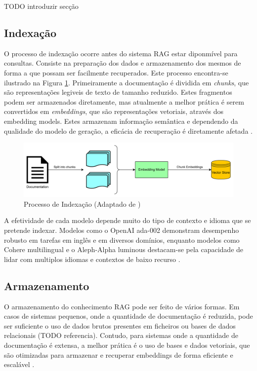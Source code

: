 TODO introduzir secção

\subsection{Indexação}

O processo de indexação ocorre antes do sistema RAG estar diponmível para consultas. Consiste na preparação dos dados e armazenamento dos mesmos de forma a que possam ser facilmente recuperados. Este processo encontra-se ilustrado na Figura \ref{fig:acrh-rag}. Primeiramente a documentação é dividida em \textit{chunks}, que são representações legiveis de texto de tamanho reduzido. Estes fragmentos podem ser armazenados diretamente, mas atualmente a melhor prática é serem convertidos em \textit{embeddings}, que são representações vetoriais, através dos embedding models. Estes armazenam informação semântica e dependendo da qualidade do modelo de geração, a eficácia de recuperação é diretamente afetada \parencite{rau2024context, vspeleticexploring}.


\begin{figure}[H]
        \centering
        \includegraphics[width=1\linewidth]{ch3/assets/arquitetura-embedding.png}
        \caption{Processo de Indexação (Adaptado de \cite{vspeleticexploring})}
        \label{fig:acrh-rag}
\end{figure}


A efetividade de cada modelo depende muito do tipo de contexto e idioma que se pretende indexar. Modelos como o OpenAI ada-002 demonstram desempenho robusto em tarefas em inglês e em diversos domínios, enquanto modelos como Cohere multilingual e o Aleph-Alpha luminous destacam-se pela capacidade de lidar com multiplos idiomas e contextos de baixo recurso \parencite{kamalloo2023evaluating}. 


\subsection{Armazenamento}

O armazenamento do conhecimento RAG pode ser feito de vários formas. Em casos de sistemas pequenos, onde a quantidade de documentação é reduzida, pode ser suficiente o uso de dados brutos presentes em ficheiros ou bases de dados relacionais (TODO referencia). Contudo, para sistemas onde a quantidade de documentação é extensa, a melhor prática é o uso de bases e dados vetoriais, que são otimizadas para armazenar e recuperar embeddings de forma eficiente e escalável \parencite{wang2024searching}. 

